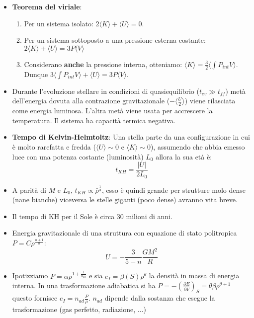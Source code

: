 \documentclass[11pt,a4paper]{article}
\begin{document}
\begin{itemize}

\item \textbf{Teorema del viriale}:

\begin{enumerate}
\item Per un sistema isolato: $2 \langle K \rangle + \langle U \rangle = 0$. 
\item Per un sistema sottoposto a una pressione esterna costante:
$2 \langle K \rangle +  \langle U \rangle = 3 P \langle  V \rangle$
\item Considerano \textbf{anche} la pressione interna, otteniamo: $\langle K \rangle = \frac{3}{2} \langle \int P_{int} V \rangle$. Dunque $3 \langle \int P_{int} V \rangle + \langle U \rangle = 3 P \langle V \rangle$.
\end{enumerate}

\item Durante l'evoluzione stellare in condizioni di quasiequilibrio ($t_{ev} \gg t_{ff}$) metà dell'energia dovuta alla contrazione gravitazionale ($- \langle \frac{U}{2} \rangle$) viene rilasciata come energia luminosa. L'altra metà viene usata per accrescere la temperatura. Il sistema ha capacità termica negativa.

\item \textbf{Tempo di Kelvin-Helmtoltz}: Una stella parte da una configurazione in cui è molto rarefatta e fredda ($\langle U \rangle \sim 0$ e $\langle K \rangle \sim 0$), assumendo che abbia emesso luce con una potenza costante (luminosità) $L_0$ allora la sua età è: 
\begin{equation}
t_{KH} = \frac{| U | }{2 L_0}
\end{equation}

\item A parità di $M$ e $L_0$, 
$t_{KH} \propto \bar{\rho}^{\frac{1}{3}}$, esso è quindi grande per strutture molo dense (nane bianche) viceversa le stelle giganti (poco dense) avranno vita breve.

\item Il tempo di KH per il Sole è circa $30$ milioni di anni.

\item Energia gravitazionale di una struttura con equazione di stato politropica $P = C \rho^{\frac{n+1}{n}}$: 
\begin{equation}
U = -\frac{3}{5-n} \frac{G M^2}{R}
\end{equation}

\item  Ipotizziamo $P = \alpha \rho^{1 + \frac{1}{n_{ad}}}$ e sia $e_I = \beta (S) \rho^{\theta}$ la densità in massa di energia interna. In una trasformazione adiabatica si ha $P = - \left( \frac{\partial E}{\partial V} \right)_{S} = \theta \beta \rho^{\theta + 1}$ questo fornisce $e_I = n_{ad} \frac{P}{\rho}$. $n_{ad}$ dipende dalla sostanza che esegue la trasformazione (gas perfetto, radiazione, ...)


\end{itemize}
\end{document}
